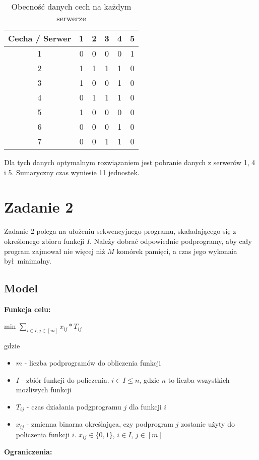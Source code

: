 \documentclass[12pt, a4paper]{article}
\begin{document}
\begin{table}[H]
\begin{center}
\begin{tabular}{|c|c|c|c|c|c|}
  \hline
  Cecha / Serwer & 1 & 2 & 3 & 4 & 5 \\
  \hline
  1 & 0 & 0 & 0 & 0 & 1 \\
  \hline
  2 & 1 & 1 & 1 & 1 & 0 \\
  \hline
  3 & 1 & 0 & 0 & 1 & 0 \\
  \hline
  4 & 0 & 1 & 1 & 1 & 0 \\
  \hline
  5 & 1 & 0 & 0 & 0 & 0 \\
  \hline
  6 & 0 & 0 & 0 & 1 & 0 \\
  \hline
  7 & 0 & 0 & 1 & 1 & 0 \\
  \hline
\end{tabular}
\caption{Obecność danych cech na każdym serwerze}
\end{center}
\end{table}

Dla tych danych optymalnym rozwiązaniem jest pobranie danych z serwerów 1, 4 i 5. Sumaryczny czas wyniesie 11 jednostek.

 
\section{Zadanie 2}

Zadanie 2 polega na ułożeniu sekwencyjnego programu, skaładającego się z określonego zbioru funkcji $I$. Należy
dobrać odpowiednie podprogramy, aby cały program zajmował nie więcej niż $M$ komórek pamięci, a czas jego wykonaia był minimalny.


\subsection{Model}

\textbf{Funkcja celu:}

\begin{center}
	min \textbf{$\displaystyle\sum_{i \in I, j \in [m]} x_{ij} * T_{ij}$}
\end{center}
gdzie

\begin{itemize}
    \item $m$ - liczba podprogramów do obliczenia funkcji
    \item $I$ - zbiór funkcji do policzenia. $i \in I \leq n$, gdzie $n$ to liczba wszystkich możliwych funkcji
    \item $T_{ij}$ - czas działania podgprogramu $j$ dla funkcji $i$
    \item $x_{ij}$ - zmienna binarna określająca, czy podprogram $j$ zostanie użyty do policzenia funkcji $i$. $x_{ij} \in \{0, 1\}$, $i \in I$, $j \in [m]$
\end{itemize}
\textbf{Ograniczenia:}
\end{document}
